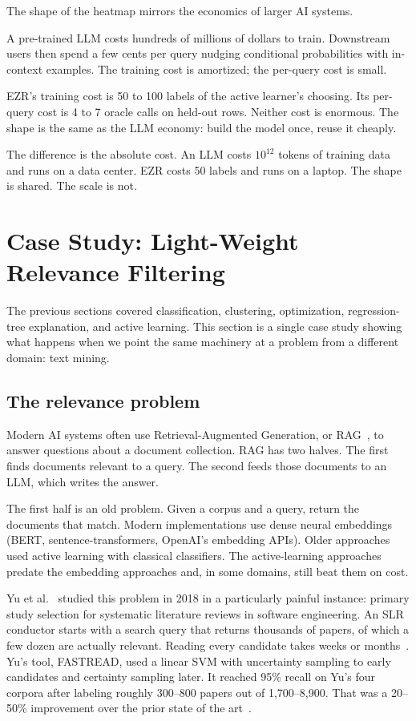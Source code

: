 \documentclass[AMA,STIX2COL]{WileyNJDv5}
\newcommand{\IT}{{\sffamily EZR}}
\begin{document}
The shape of the heatmap mirrors the economics of larger AI
systems.

A pre-trained LLM costs hundreds of millions of dollars to
train. Downstream users then spend a few cents per query
nudging conditional probabilities with in-context examples. The
training cost is amortized; the per-query cost is small.

\IT{}'s training cost is 50 to 100 labels of the active
learner's choosing. Its per-query cost is 4 to 7 oracle calls
on held-out rows. Neither cost is enormous. The shape is the
same as the LLM economy: build the model once, reuse it
cheaply.

The difference is the absolute cost. An LLM costs
$10^{12}$ tokens of training data and runs on a data center.
\IT{} costs 50 labels and runs on a laptop. The shape is shared.
The scale is not.

\section{Case Study: Light-Weight Relevance Filtering}\label{sec:textmine}

The previous sections covered classification, clustering,
optimization, regression-tree explanation, and active learning.
This section is a single case study showing what happens when we
point the same machinery at a problem from a different domain:
text mining.

\subsection{The relevance problem}

Modern AI systems often use Retrieval-Augmented Generation, or
RAG~\cite{lewis2020retrieval}, to answer questions about a
document collection. RAG has two halves. The first finds
documents relevant to a query. The second feeds those documents
to an LLM, which writes the answer.

The first half is an old problem. Given a corpus and a query,
return the documents that match. Modern implementations use
dense neural embeddings (BERT, sentence-transformers, OpenAI's
embedding APIs). Older approaches used active learning with
classical classifiers. The active-learning approaches predate
the embedding approaches and, in some domains, still beat them
on cost.

Yu et al.~\cite{yu2018finding} studied this problem in 2018 in a
particularly painful instance: primary study selection for
systematic literature reviews in software engineering. An SLR
conductor starts with a search query that returns thousands of
papers, of which a few dozen are actually relevant. Reading
every candidate takes weeks or months~\cite{kitchenham2010,
carver2013}. Yu's tool, FASTREAD, used a linear SVM with
uncertainty sampling to early candidates and certainty sampling
later. It reached 95\% recall on Yu's four corpora after labeling
roughly 300--800 papers out of 1,700--8,900. That was a
20--50\% improvement over the prior state of the
art~\cite{wallace2010,miwa2014,cormack2014}.
\end{document}
